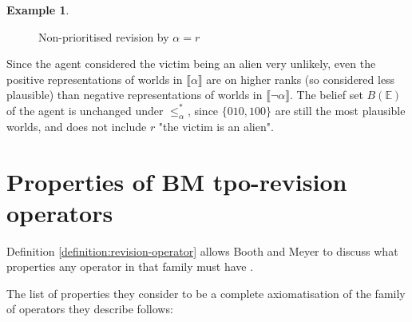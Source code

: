 \documentclass[english, 12pt]{scrartcl}
\theoremstyle{definition}
\newtheorem{example}{Example}
\theoremstyle{definition}
\theoremstyle{definition}
\newcommand{\modelsOf}[1]{\llbracket #1 \rrbracket}
\begin{document}
\begin{example}
\begin{figure}[H]
            \caption{Non-prioritised revision by $\alpha = r$}
            \label{fig:example-non-prio-revision}
    \end{figure}
    
    Since the agent considered the victim being an alien very unlikely, even the positive representations of worlds in $\modelsOf{\alpha}$ are on higher ranks (so considered less plausible) than negative representations of worlds in $\modelsOf{\neg\alpha}$.
    The belief set $B(\mathbb{E})$ of the agent is unchanged under $\leq_{\alpha}^{\ast}$, since $\{010, 100\}$ are still the most plausible worlds, and does not include $r$ "the victim is an alien".
\end{example}

\section{Properties of BM tpo-revision operators}
\label{section:properties-of-bm-tpo-revision-operators}
Definition \ref{definition:revision-operator} allows Booth and Meyer to discuss what properties any operator in that family must have \cite{Booth2011}.

The list of properties they consider to be a complete axiomatisation of the family of operators they describe follows:
\end{document}
